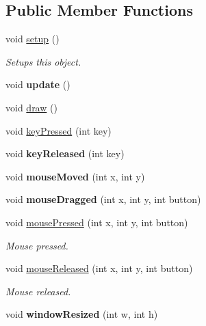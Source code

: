 \subsection*{Public Member Functions}
\begin{DoxyCompactItemize}
\item 
void \hyperlink{classtest_app_ad431db15b6150b965cd52bcba8e16e11}{setup} ()
\begin{DoxyCompactList}\small\item\em Setups this object. \end{DoxyCompactList}\item 
\hypertarget{classtest_app_afb39d201aec71a295b7609876bf7d0c6}{void {\bfseries update} ()}\label{classtest_app_afb39d201aec71a295b7609876bf7d0c6}

\item 
void \hyperlink{classtest_app_af869cba67b1dab8481f8d0e216d59dcd}{draw} ()
\item 
void \hyperlink{classtest_app_a904d147c7e532cb92656d5dd4895cd26}{key\-Pressed} (int key)
\item 
\hypertarget{classtest_app_a1116a10088e4932f6d482efe723cd45e}{void {\bfseries key\-Released} (int key)}\label{classtest_app_a1116a10088e4932f6d482efe723cd45e}

\item 
\hypertarget{classtest_app_a33541b19eff9f8285b2487bfc146d58b}{void {\bfseries mouse\-Moved} (int x, int y)}\label{classtest_app_a33541b19eff9f8285b2487bfc146d58b}

\item 
\hypertarget{classtest_app_a075bcc2be16fd8f3eaa9162fb40a0a1f}{void {\bfseries mouse\-Dragged} (int x, int y, int button)}\label{classtest_app_a075bcc2be16fd8f3eaa9162fb40a0a1f}

\item 
void \hyperlink{classtest_app_a3f200702ce91859cac2872a39302679d}{mouse\-Pressed} (int x, int y, int button)
\begin{DoxyCompactList}\small\item\em Mouse pressed. \end{DoxyCompactList}\item 
void \hyperlink{classtest_app_aa3680ffc782b1e5c451289817f20c9c6}{mouse\-Released} (int x, int y, int button)
\begin{DoxyCompactList}\small\item\em Mouse released. \end{DoxyCompactList}\item 
\hypertarget{classtest_app_a428b7df9c64352d6e7cb234fc297e6c9}{void {\bfseries window\-Resized} (int w, int h)}\label{classtest_app_a428b7df9c64352d6e7cb234fc297e6c9}


\end{DoxyCompactItemize}
